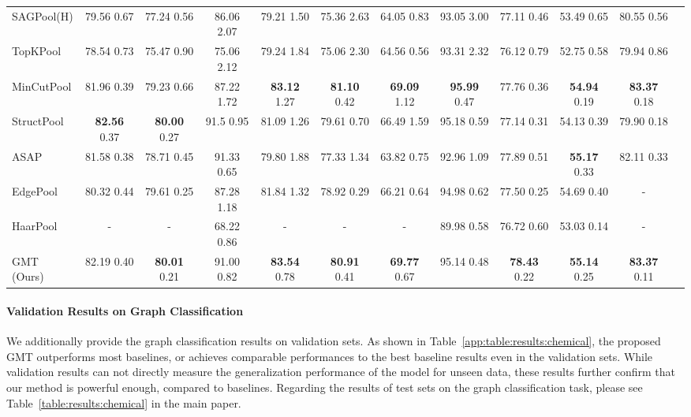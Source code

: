\documentclass{article} \usepackage{iclr2021_conference,times}
\begin{document}
\begin{table*}[t]
{\begin{tabular}{lccccccccccc}
SAGPool(H) & 79.56  0.67 & 77.24  0.56 & 86.06  2.07 & 79.21  1.50 & 75.36  2.63 & 64.05  0.83 & 93.05  3.00 & 77.11  0.46 & 53.49  0.65 & 80.55  0.56 \\
TopKPool   & 78.54  0.73 & 75.47  0.90 & 75.06  2.12 & 79.24  1.84 & 75.06  2.30 & 64.56  0.56 & 93.31  2.32 & 76.12  0.79 & 52.75  0.58 & 79.94  0.86 \\
MinCutPool & 81.96  0.39 & 79.23  0.66 & 87.22  1.72 & \textbf{83.12}  1.27 & \textbf{81.10}  0.42 & \textbf{69.09}  1.12 & \textbf{95.99}  0.47 & 77.76  0.36 & \textbf{54.94}  0.19 & \textbf{83.37}  0.18 \\
StructPool & \textbf{82.56}  0.37 & \textbf{80.00}  0.27 & 91.5  0.95 & 81.09  1.26 & 79.61  0.70 & 66.49  1.59 & 95.18  0.59 & 77.14  0.31 & 54.13   0.39 & 79.90  0.18 \\
ASAP       & 81.58  0.38 & 78.71  0.45 & 91.33 0.65 &  79.80  1.88  & 77.33  1.34 & 63.82  0.75 & 92.96  1.09 & 77.89  0.51 & \textbf{55.17}   0.33 & 82.11  0.33 \\
EdgePool   & 80.32  0.44 & 79.61  0.25 & 87.28 1.18 & 81.84  1.32 & 78.92  0.29 & 66.21  0.64 & 94.98  0.62 & 77.50  0.25 & 54.69   0.40 &         -        \\
HaarPool   &         -        & - & 68.22 0.86 &         -        &         -        &         -        & 89.98  0.58 & 76.72  0.60 & 53.03   0.14 &         -        \\
\midrule
GMT (Ours) & 82.19  0.40 & \textbf{80.01}  0.21 & 91.00  0.82 & \textbf{83.54}  0.78 & \textbf{80.91}  0.41 & \textbf{69.77}  0.67 & 95.14  0.48 & \textbf{78.43}  0.22 & \textbf{55.14}  0.25 & \textbf{83.37}  0.11 \\
\bottomrule
\end{tabular}
}
\vspace{-0.15in}
\label{app:table:results:chemical}
\end{table*} 
\paragraph{Validation Results on Graph Classification}
We additionally provide the graph classification results on validation sets. As shown in Table~\ref{app:table:results:chemical}, the proposed GMT outperforms most baselines, or achieves comparable performances to the best baseline results even in the validation sets. While validation results can not directly measure the generalization performance of the model for unseen data, these results further confirm that our method is powerful enough, compared to baselines. Regarding the results of test sets on the graph classification task, please see Table~\ref{table:results:chemical} in the main paper.
\end{document}
